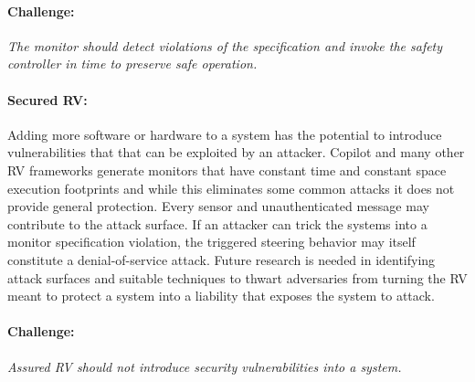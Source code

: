 \paragraph{Challenge:} \emph{The monitor should detect violations of
  the specification and invoke the safety controller in time to
  preserve safe operation.}


\paragraph{Secured RV:} Adding more software or hardware to a system
has the potential to introduce vulnerabilities that that can be
exploited by an attacker.  Copilot and many other RV frameworks
generate monitors that have constant time and constant space execution
footprints and while this eliminates some common attacks it does not
provide general protection. Every sensor and unauthenticated message
may contribute to the attack surface. If an attacker can trick the
systems into a monitor specification violation, the triggered steering
behavior may itself constitute a denial-of-service attack.  Future
research is needed in identifying attack surfaces and suitable
techniques to thwart adversaries from turning the RV meant to protect
a system into a liability that exposes the system to attack.

\paragraph{Challenge:} \emph{Assured RV should not introduce security
vulnerabilities into a system.} 



